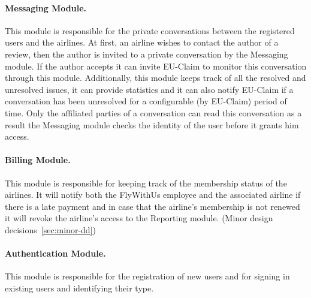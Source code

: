 \paragraph{Messaging Module.} This module is responsible for the private conversations between the registered users and the airlines. At first, an airline wishes to contact the author of a review, then the author is invited to a private conversation by the Messaging module. If the author accepts it can invite EU-Claim to monitor this conversation through this module. Additionally, this module keeps track of all the resolved and unresolved issues, it can provide statistics and it can also notify EU-Claim if a conversation has been unresolved for a configurable (by EU-Claim) period of time. Only the affiliated parties of a conversation can read this conversation as a result the Messaging module checks the identity of the user before it grants him access.

\paragraph{Billing Module.} This module is responsible for keeping track of the membership status of the airlines. It will notify both the FlyWithUs employee and the associated airline if there is a late payment and in case that the airline's membership is not renewed it will revoke the airline's access to the Reporting module. (Minor design decisions~\ref{sec:minor-dd})

\paragraph{Authentication Module.} This module is responsible for the registration of new users and for signing in existing users and identifying their type.

